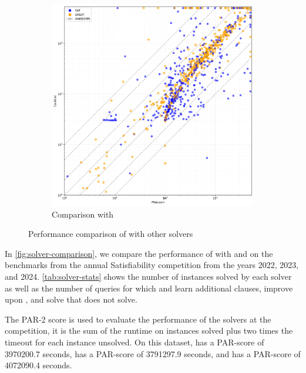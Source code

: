 \begin{figure}[!t]
\begin{subfigure}[t]{0.4\textwidth}
        \includegraphics[width=\textwidth]{figs/cautical_vs_prelearn_log.png}
        \caption{Comparison with \prelearn}
        \label{fig:cautical-vs-prelearn}
    \end{subfigure}
    \caption{Performance comparison of \tool with other solvers}
    \label{fig:solver-comparison}
\end{figure}

In \autoref{fig:solver-comparison}, we compare the performance of \tool with \cadical and \prelearn on the benchmarks from the annual Satisfiability competition from the years 2022, 2023, and 2024. \autoref{tab:solver-stats} shows the number of instances solved by each solver as well as the number of queries for which \prelearn and \cadical learn additional clauses, improve upon \cadical, and solve that \cadical does not solve.

The PAR-2 score is used to evaluate the performance of the solvers at the competition, it is the sum of the runtime on instances solved plus two times the timeout for each instance unsolved. On this dataset, \cadical has a PAR-score of 3970200.7 seconds, \prelearn has a PAR-score of 3791297.9 seconds, and \tool has a PAR-score of 4072090.4 seconds.

